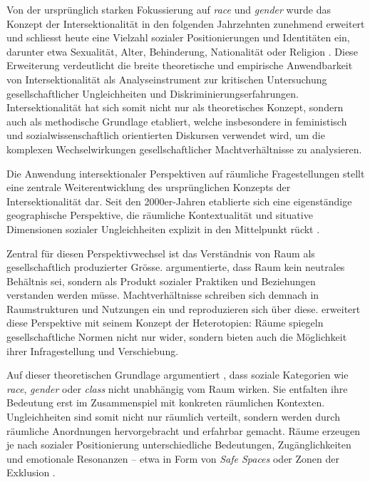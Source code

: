 Von der ursprünglich starken Fokussierung auf \textit{race} und \textit{gender} wurde das Konzept der Intersektionalität in den folgenden Jahrzehnten zunehmend erweitert und schliesst heute eine Vielzahl sozialer Positionierungen und Identitäten ein, darunter etwa Sexualität, Alter, Behinderung, Nationalität oder Religion \parencite{bauerIntersectionalityQuantitativeResearch2021, bowlegInvitedReflectionQuantifying2016}. Diese Erweiterung verdeutlicht die breite theoretische und empirische Anwendbarkeit von Intersektionalität als Analyseinstrument zur kritischen Untersuchung gesellschaftlicher Ungleichheiten und Diskriminierungserfahrungen. Intersektionalität hat sich somit nicht nur als theoretisches Konzept, sondern auch als methodische Grundlage etabliert, welche insbesondere in feministisch und sozialwissenschaftlich orientierten Diskursen verwendet wird, um die komplexen Wechselwirkungen gesellschaftlicher Machtverhältnisse zu analysieren.

\vspace{2em}

Die Anwendung intersektionaler Perspektiven auf räumliche Fragestellungen stellt eine zentrale Weiterentwicklung des ursprünglichen Konzepts der Intersektionalität dar. Seit den 2000er-Jahren etablierte sich eine eigenständige geographische Perspektive, die räumliche Kontextualität und situative Dimensionen sozialer Ungleichheiten explizit in den Mittelpunkt rückt \parencite{valentineTheorizingResearchingIntersectionality2007, rodo-de-zarateIntersectionalityFeministGeographies2018}.

Zentral für diesen Perspektivwechsel ist das Verständnis von Raum als gesellschaftlich produzierter Grösse. \textcite{lefebvreProductionLespace1974} argumentierte, dass Raum kein neutrales Behältnis sei, sondern als Produkt sozialer Praktiken und Beziehungen verstanden werden müsse. Machtverhältnisse schreiben sich demnach in Raumstrukturen und Nutzungen ein und reproduzieren sich über diese. \textcite{foucaultEspacesAutres2004} erweitert diese Perspektive mit seinem Konzept der Heterotopien: Räume spiegeln gesellschaftliche Normen nicht nur wider, sondern bieten auch die Möglichkeit ihrer Infragestellung und Verschiebung.

Auf dieser theoretischen Grundlage argumentiert \textcite{valentineTheorizingResearchingIntersectionality2007}, dass soziale Kategorien wie \textit{race}, \textit{gender} oder \textit{class} nicht unabhängig vom Raum wirken. Sie entfalten ihre Bedeutung erst im Zusammenspiel mit konkreten räumlichen Kontexten. Ungleichheiten sind somit nicht nur räumlich verteilt, sondern werden durch räumliche Anordnungen hervorgebracht und erfahrbar gemacht. Räume erzeugen je nach sozialer Positionierung unterschiedliche Bedeutungen, Zugänglichkeiten und emotionale Resonanzen -- etwa in Form von \textit{Safe Spaces} oder Zonen der Exklusion \parencite[\acrshort{vgl}][S.~548--549]{rodo-de-zarateIntersectionalityFeministGeographies2018}.

